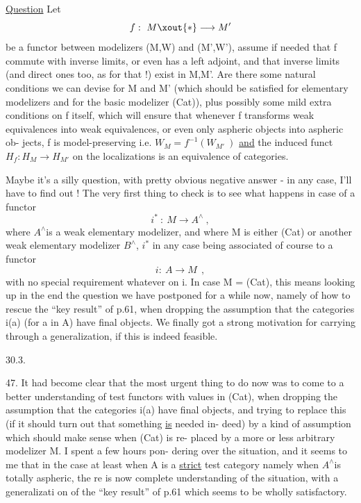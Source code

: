 
\uline{Question}  Let
\[ f:\ M\xout{*}\longrightarrow M' \]
be a functor between modelizers (M,W) and (M',W'),  assume  if
needed that f commute with  inverse limits,  or even has a left adjoint,
and that  inverse limits (and direct ones too,  as for that !)
exist in M,M'.  Are there some natural conditions we can devise for
M and M'  (which should be satisfied for elementary modelizers and for
the basic modelizer (Cat)),  plus possibly some mild extra conditions on
f itself,  which will ensure that whenever f transforms weak equivalences
into weak equivalences,  or even only aspheric objects into aspheric ob-%
jects,  f is model-preserving i.e.  $W_M = f^{-1}(W_{M'}\ )$  \uline{and} the induced funct
$H_f : H_M \longrightarrow H_{M'}$  on the localizations is an equivalence of categories.

Maybe it's a silly question,  with pretty obvious negative answer
-  in any case,  I'll have to find out !  The very first thing to check
is to see what happens in case of a functor
\[ i^{*}\ :\ M\longrightarrow A^{\wedge}\ , \]
where $A^{\wedge}$is a weak elementary modelizer,  and where M is either (Cat) or
another weak elementary modelizer $B^{\wedge}$,  $i^{*}$ in any case being associated of
course to a functor
\[ i:\ A\longrightarrow M\ \ , \]
with  no special requirement whatever on i.   In case  M = (Cat),  this
means looking up in the end the question we have postponed for  a while
now,  namely of how to rescue the ``key result'' of p.61,  when dropping the
assumption that the categories i(a)  (for a in A) have final objects. We
finally got a strong motivation for carrying through a generalization,  if
this is indeed feasible.

30.3.

47.     It had become clear that the most urgent thing to do now was to
come to a better understanding of test functors with values in (Cat),  when
dropping the assumption that the categories i(a) have final objects,  and
trying to replace this (if it should turn out that something \uline{is} needed in-%
deed)  by a kind of assumption which should make sense when (Cat) is re-%
placed by a more or less arbitrary modelizer M.  I spent a few hours pon-%
dering over the situation,  and it seems to me that\hand{,} in the case at least
when A is a \uline{strict} test category\hand{,} namely when $A^{\wedge}$\hand{/}is totally aspheric,  the\unsure{-}%
re is now   complete understanding of the situation,  with a generalizati\unsure{-}%
on of the ``key result'' of p.61 which seems to be wholly satisfactory.

